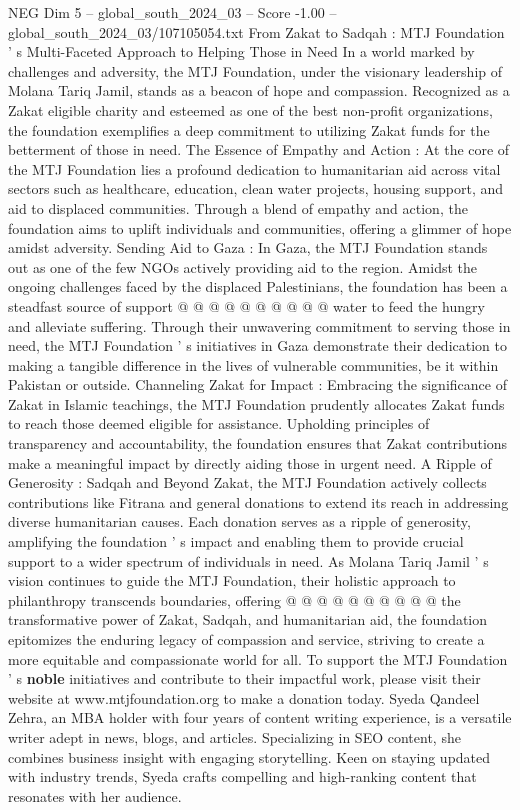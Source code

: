 \begin{textsample}{NEG Dim 5 – global\_south\_2024\_03 – Score -1.00 – global\_south\_2024\_03/107105054.txt}  \label{ex:f5_neg_310}
From Zakat to Sadqah : MTJ Foundation ' s Multi-Faceted Approach to Helping Those in Need In a world marked by challenges and adversity, the MTJ Foundation, under the visionary leadership of Molana Tariq Jamil, stands as a beacon of hope and compassion.
Recognized as a Zakat eligible charity and esteemed as one of the best non-profit organizations, the foundation exemplifies a deep commitment to utilizing Zakat funds for the betterment of those in need.
The Essence of Empathy and Action : At the core of the MTJ Foundation lies a profound dedication to humanitarian aid across vital sectors such as healthcare, education, clean water projects, housing support, and aid to displaced communities.
Through a blend of empathy and action, the foundation aims to uplift individuals and communities, offering a glimmer of hope amidst adversity.
Sending Aid to Gaza : In Gaza, the MTJ Foundation stands out as one of the few NGOs actively providing aid to the region.
Amidst the ongoing challenges faced by the displaced Palestinians, the foundation has been a steadfast source of support @ @ @ @ @ @ @ @ @ @ water to feed the hungry and alleviate suffering.
Through their unwavering commitment to serving those in need, the MTJ Foundation ' s initiatives in Gaza demonstrate their dedication to making a tangible difference in the lives of vulnerable communities, be it within Pakistan or outside.
Channeling Zakat for Impact : Embracing the significance of Zakat in Islamic teachings, the MTJ Foundation prudently allocates Zakat funds to reach those deemed eligible for assistance.
Upholding principles of transparency and accountability, the foundation ensures that Zakat contributions make a meaningful impact by directly aiding those in urgent need.
A Ripple of Generosity : Sadqah and Beyond Zakat, the MTJ Foundation actively collects contributions like Fitrana and general donations to extend its reach in addressing diverse humanitarian causes.
Each donation serves as a ripple of generosity, amplifying the foundation ' s impact and enabling them to provide crucial support to a wider spectrum of individuals in need.
As Molana Tariq Jamil ' s vision continues to guide the MTJ Foundation, their holistic approach to philanthropy transcends boundaries, offering @ @ @ @ @ @ @ @ @ @ the transformative power of Zakat, Sadqah, and humanitarian aid, the foundation epitomizes the enduring legacy of compassion and service, striving to create a more equitable and compassionate world for all.
To support the MTJ Foundation ' s \textbf{noble} initiatives and contribute to their impactful work, please visit their website at www.mtjfoundation.org to make a donation today.
Syeda Qandeel Zehra, an MBA holder with four years of content writing experience, is a versatile writer adept in news, blogs, and articles.
Specializing in SEO content, she combines business insight with engaging storytelling.
Keen on staying updated with industry trends, Syeda crafts compelling and high-ranking content that resonates with her audience.

\end{textsample}

